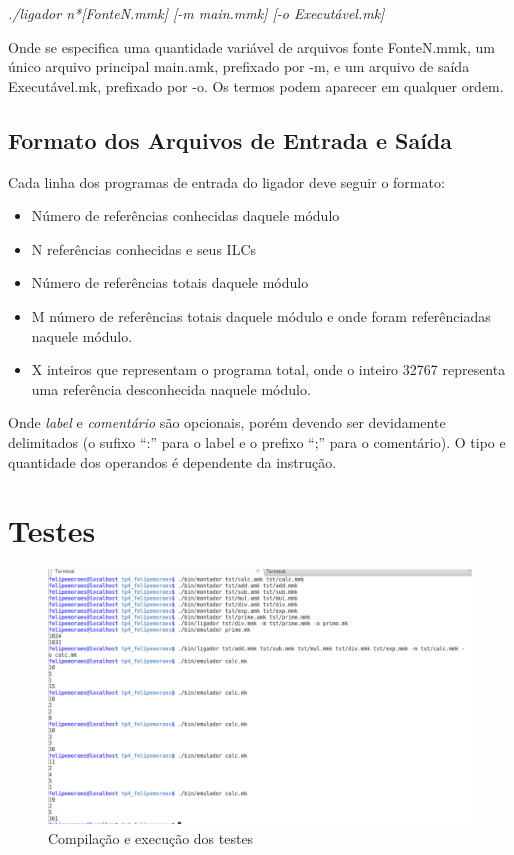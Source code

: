\documentclass[12pt, a4paper]{article}
\begin{document}
\begin{itemize}
\begin{center}
\emph{./ligador n*[FonteN.mmk] [-m main.mmk] [-o Executável.mk]}
\end{center}

Onde se especifica uma quantidade variável de arquivos fonte FonteN.mmk, um único arquivo principal main.amk, prefixado por -m, e um arquivo de saída Executável.mk, prefixado por -o. Os termos podem aparecer em qualquer ordem.

\subsection{Formato dos Arquivos de Entrada e Saída}

Cada linha dos programas de entrada do ligador deve seguir o formato:

\begin{itemize}
\item Número de referências conhecidas daquele módulo

\item N referências conhecidas e seus ILCs

\item Número de referências totais daquele módulo

\item M número de referências totais daquele módulo e onde foram referênciadas naquele módulo.

\item X inteiros que representam o programa total, onde o inteiro 32767 representa uma referência desconhecida naquele módulo. 
\end{itemize}

Onde \emph{label} e \emph{comentário} são opcionais, porém devendo ser devidamente delimitados (o sufixo ``:'' para o label e o prefixo ``;'' para o comentário). O tipo e quantidade dos operandos é dependente da instrução.

\section{Testes}

\begin{figure}
\centering
\includegraphics[width=1.5\textwidth]{screenshot.png}
\caption{Compilação e execução dos testes}
\label{FigureExecution}
\end{figure}


\end{itemize}
\end{document}
